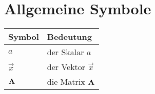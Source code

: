 \label{s.sym} %
\section*{Allgemeine Symbole}\label{s.sym.alg}
\begin{flushleft}\begin{tabularx}{\textwidth}{l|X}
Symbol & Bedeutung\\\hline
$a$ & der Skalar $a$ \\
$\vec{x}$ & der Vektor $\vec{x}$\\
${\textbf{A}}$ & die Matrix ${\textbf{A}}$\\
\end{tabularx}\end{flushleft}





